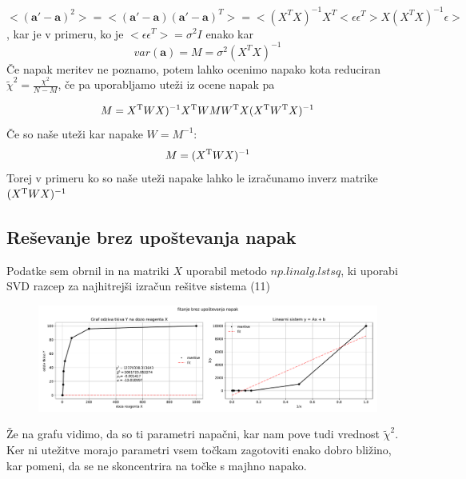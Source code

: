 \documentclass[11pt, a4paper]{article}
\renewcommand{\vec}[1]{\mathbf{#1}}
\begin{document}
\[
<(\vec{a'} - \vec{a})^2> = <(\vec{a'} - \vec{a})(\vec{a'} - \vec{a})^T> = <(X^TX)^{-1} X^T <\epsilon \epsilon^T >X (X^TX)^{-1}  \epsilon>
\],
kar je v primeru, ko je $<\epsilon \epsilon^T > = \sigma^2 I $ enako kar 
\begin{equation}
var (\vec{a}) = M = \sigma^2(X^TX)^{-1}
\end{equation} 
Če napak meritev ne poznamo, potem lahko ocenimo napako kota reduciran $\widetilde{\chi}^2 = \frac{\chi^2}{N-M}$, če pa uporabljamo uteži iz ocene napak pa 

\begin{equation}
M=X^{\rm {T}}WX)^{-1}X^{\rm {T}}WMW^{\rm {T}}X(X^{\rm {T}}W^{\rm {T}}X)^{-1} 
\end{equation} 
Če so naše uteži kar napake $W = M^{-1}$:
\begin{equation}
M=(X^{\rm {T}}WX)^{-1}
\end{equation}
Torej v primeru ko so naše uteži napake lahko le izračunamo inverz matrike $(X^{\rm {T}}WX)^{-1}$
\subsection{Reševanje brez upoštevanja napak}
Podatke sem obrnil in na matriki $X$ uporabil metodo $np.linalg.lstsq$, ki uporabi SVD razcep za najhitrejši izračun rešitve sistema (11)
\begin{figure}[H]
\hspace*{-2.2cm}     
  \includegraphics[width=20.5cm]{prva_brez_napak.pdf}  
\end{figure}
Že na grafu vidimo, da so ti parametri napačni, kar nam pove tudi vrednost $\widetilde{\chi}^2$. Ker ni utežitve morajo parametri vsem točkam zagotoviti enako dobro bližino, kar pomeni, da se ne skoncentrira na točke s majhno napako. 
\end{document}
